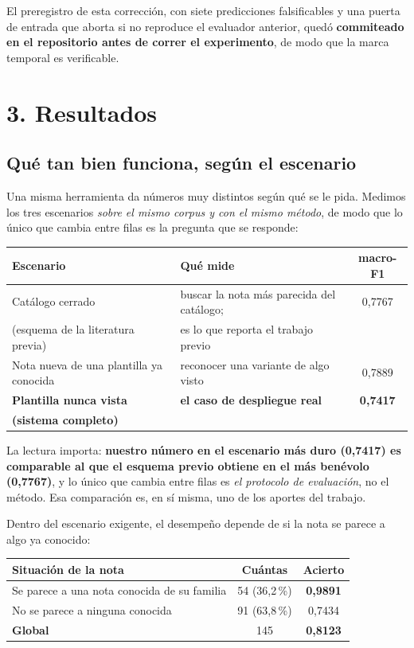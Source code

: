 \documentclass[11pt,a4paper]{article}
\begin{document}
El preregistro de esta corrección, con siete predicciones falsificables y una puerta de entrada que
aborta si no reproduce el evaluador anterior, quedó \textbf{commiteado en el repositorio antes de
correr el experimento}, de modo que la marca temporal es verificable.

\section*{3. Resultados}

\subsection*{Qué tan bien funciona, según el escenario}

Una misma herramienta da números muy distintos según qué se le pida. Medimos los tres escenarios
\emph{sobre el mismo corpus y con el mismo método}, de modo que lo único que cambia entre filas es la
pregunta que se responde:

\begin{center}
\small
\begin{tabular}{llc}
\toprule
\textbf{Escenario} & \textbf{Qué mide} & \textbf{macro-F1} \\
\midrule
Catálogo cerrado & buscar la nota más parecida del catálogo; & 0,7767 \\
(esquema de la literatura previa) & es lo que reporta el trabajo previo & \\[3pt]
Nota nueva de una plantilla ya conocida & reconocer una variante de algo visto & 0,7889 \\[3pt]
\textbf{Plantilla nunca vista} & \textbf{el caso de despliegue real} & \textbf{0,7417} \\
\textbf{(sistema completo)} & & \\
\bottomrule
\end{tabular}
\end{center}

La lectura importa: \textbf{nuestro número en el escenario más duro (0,7417) es comparable al que el
esquema previo obtiene en el más benévolo (0,7767)}, y lo único que cambia entre filas es \emph{el
protocolo de evaluación}, no el método. Esa comparación es, en sí misma, uno de los aportes del
trabajo.

Dentro del escenario exigente, el desempeño depende de si la nota se parece a algo ya conocido:

\begin{center}
\small
\begin{tabular}{lcc}
\toprule
\textbf{Situación de la nota} & \textbf{Cuántas} & \textbf{Acierto} \\
\midrule
Se parece a una nota conocida de su familia & 54 (36,2\,\%) & \textbf{0,9891} \\
No se parece a ninguna conocida & 91 (63,8\,\%) & 0,7434 \\
\midrule
\textbf{Global} & 145 & \textbf{0,8123} \\
\bottomrule
\end{tabular}
\end{center}
\end{document}
